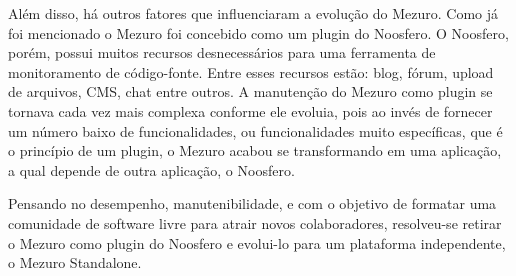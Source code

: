   
Além disso, há outros fatores que influenciaram a evolução do Mezuro. Como já foi mencionado o Mezuro foi concebido como um plugin do Noosfero. O Noosfero, porém, possui muitos recursos desnecessários para uma ferramenta de monitoramento de código-fonte. Entre esses recursos estão: blog, fórum, upload de arquivos, CMS, chat entre outros. A manutenção do Mezuro como plugin se tornava cada vez mais complexa conforme ele evoluia, pois ao invés de fornecer um número baixo de funcionalidades, ou funcionalidades muito específicas, que é o princípio de um plugin, o Mezuro acabou se transformando em uma aplicação, a qual depende de outra aplicação, o Noosfero. 

Pensando no desempenho, manutenibilidade, e com o objetivo de formatar uma comunidade de software livre para atrair novos colaboradores, resolveu-se retirar o Mezuro como plugin do Noosfero e evolui-lo para um plataforma independente, o Mezuro Standalone.
  


